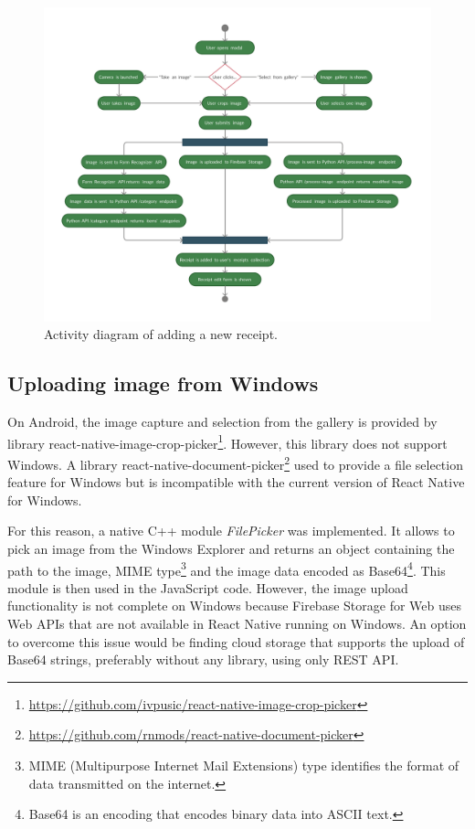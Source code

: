 \documentclass[
  digital, %
  table,   %
  oneside, %
  lof,     %
  lot,     %
]{fithesis3}
\newcommand{\definition}[1]{{#1}}
\begin{document}
\begin{figure}
    \begin{center}
        \includegraphics[width=\textwidth]{figures/diagrams/add_receipt_android}
    \end{center}
    \caption{Activity diagram of adding a new receipt.}
    \label{fig:add_receipt_android}
\end{figure}

\subsection{Uploading image from Windows}
On Android, the image capture and selection from the gallery is provided by library react-native-image-crop-picker\footnote{\url{https://github.com/ivpusic/react-native-image-crop-picker}}. However, this library does not support Windows. A library react-native-document-picker\footnote{\url{https://github.com/rnmods/react-native-document-picker}} used to provide a file selection feature for Windows but is incompatible with the current version of React Native for Windows. 

For this reason, a native C++ module \textit{FilePicker} was implemented. It allows to pick an image from the Windows Explorer and returns an object containing the path to the image, MIME type\footnote{MIME (Multipurpose Internet Mail Extensions) type identifies the format of data transmitted on the internet.} and the image data encoded as Base64\footnote{\definition{Base64} is an encoding that encodes binary data into ASCII text.}. This module is then used in the JavaScript code. However, the image upload functionality is not complete on Windows because Firebase Storage for Web uses Web APIs that are not available in React Native running on Windows. An option to overcome this issue would be finding cloud storage that supports the upload of Base64 strings, preferably without any library, using only REST API.
\end{document}
